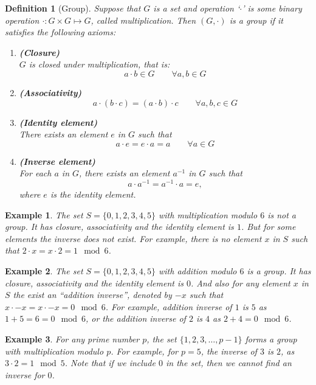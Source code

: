 \documentclass[12pt]{article}
\newtheorem{example}{Example}
\newtheorem{definition}{Definition}
\begin{document}
\begin{definition}[Group]
	Suppose that $G$ is a set and operation `$\cdot$'  is some binary operation $\cdot : G \times G \mapsto G$, called multiplication. Then $(G,\cdot)$ is a group if it satisfies the following axioms:
	\begin{enumerate}
		\item \textbf{(Closure)}\\
		$G$ is closed under multiplication, that is:
		$$a\cdot b \in G\qquad \forall a,b\in G$$
		\item \textbf{ (Associativity) }\\
		$$a\cdot \left(b\cdot c\right) =  \left(a\cdot b\right) \cdot c \qquad \forall a,b,c\in G$$
		\item \textbf{ (Identity element) }\\
		There exists an element $e$ in $G$ such that
		$$a\cdot e = e \cdot a = a \qquad \forall a \in G$$
		\item  \textbf{(Inverse element)}\\
		For each $a$ in $G$, there exists an element $a^{-1}$ in $G$ such that 
		$$a\cdot a^{-1} = a^{-1} \cdot a = e,$$ where $e$ is the identity element.
	\end{enumerate}
\end{definition}


\begin{example}
	The set $S=\{0, 1, 2, 3, 4, 5\}$ with multiplication modulo $6$ is \textit{not} a group. It has closure, associativity and the identity element is $1$. But for some elements the inverse does not exist. For example, there is no element $x$ in $S$ such that $2\cdot x = x \cdot 2 = 1 \mod 6$. 
\end{example}


\begin{example}
	The set $S=\{0, 1, 2, 3, 4, 5\}$ with addition modulo $6$ is a group. It has closure, associativity and the identity element is $0$. And also for any element $x$ in $S$ the exist an ``addition inverse'', denoted by $-x$ such that $x \cdot -x = x \cdot -x = 0 \mod 6$. For example, addition inverse of $1$ is $5$ as $1+5 = 6 = 0 \mod 6$, or the addition inverse of $2$ is $4$ as $2+4  = 0 \mod 6$.
\end{example}


\begin{example}
	For any prime number $p$, the set $\{1, 2, 3, \ldots , p-1\}$ forms a group with multiplication modulo $p$. For example, for $p=5$, the inverse of $3$ is $2$, as $3 \cdot 2 = 1 \mod 5$. Note that if we include $0$ in the set, then we cannot find an inverse for $0$.
\end{example}
\end{document}
